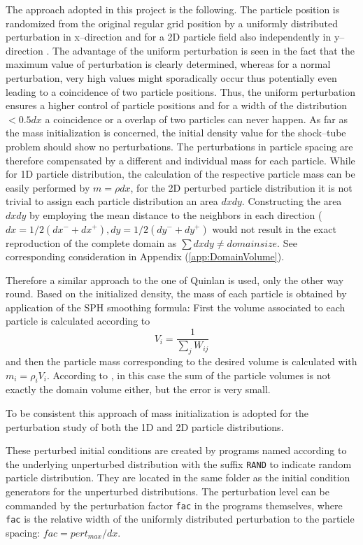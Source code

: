 \documentclass[11pt,a4paper,twoside]{report}
\begin{document}
 The approach adopted in this project is the following. The particle position is randomized from the original regular grid position by a uniformly distributed perturbation in x--direction and for a 2D particle field also independently in y--direction . The advantage of the uniform perturbation is seen in the fact that the maximum value of perturbation is clearly determined, whereas for a normal perturbation, very high values might sporadically occur thus potentially even leading to a coincidence of two particle positions.                                             
 Thus, the uniform perturbation ensures a higher control of particle positions and for a width of the distribution $<0.5dx$ a coincidence or a overlap of two particles can never happen. As far as the mass initialization is concerned, the initial density value for the shock--tube problem should show no perturbations. The perturbations in particle spacing are therefore compensated by a different and individual mass for each particle. While for 1D particle distribution, the calculation of the respective particle mass can be easily performed by $m=\rho dx$, for the 2D perturbed particle distribution it is not trivial to assign each particle distribution an area $dx dy$. Constructing the area $dx dy$ by employing the mean distance to the neighbors in each direction ($dx=1/2(dx^-+dx^+),dy=1/2(dy^-+dy^+)$ would not result in the exact reproduction of the complete domain as $\sum dxdy\neq domain size$. See corresponding consideration in Appendix (\ref{app:DomainVolume}).

 Therefore a similar approach to the one of Quinlan \cite{Quinlan2006} is used, only the other way round. Based on the initialized density, the mass of each particle is obtained by application of the SPH smoothing formula: First the volume associated to each particle is calculated according to
 \begin{equation}
  V_i=\frac{1}{\sum_j W_{ij}}
 \end{equation}
 and then the particle mass corresponding to the desired volume is calculated with $m_i=\rho_i V_i$. According to \cite{Espanol2003}, in this case the sum of the particle volumes is not exactly the domain volume either, but the error is very small.

 To be consistent this approach of mass initialization is adopted for the perturbation study of both the 1D and 2D particle distributions.

 These perturbed initial conditions are created by programs named according to the underlying unperturbed distribution with the suffix {\tt RAND} to indicate random particle distribution. They are located in the same folder as the initial condition generators for the unperturbed distributions. The perturbation level can be commanded by the perturbation factor {\tt fac} in the programs themselves, where {\tt fac} is the relative width of the uniformly distributed perturbation to the particle spacing: $\mathit{fac}=\mathit{pert_{max}}/dx$.
\end{document}
